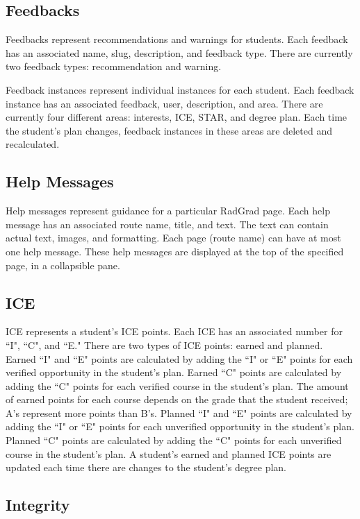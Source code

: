 \subsection{Feedbacks}
Feedbacks represent recommendations and warnings for students. Each feedback has an associated name, slug, description, and feedback type. There are currently two feedback types: recommendation and warning. 

Feedback instances represent individual instances for each student. Each feedback instance has an associated feedback, user, description, and area. There are currently four different areas: interests, ICE, STAR, and degree plan. Each time the student's plan changes, feedback instances in these areas are deleted and recalculated.

\subsection{Help Messages}
Help messages represent guidance for a particular RadGrad page. Each help message has an associated route name, title, and text. The text can contain actual text, images, and formatting. Each page (route name) can have at most one help message. These help messages are displayed at the top of the specified page, in a collapsible pane.  


\subsection{ICE}
ICE represents a student's ICE points. Each ICE has an associated number for ``I", ``C", and ``E." There are two types of ICE points: earned and planned. Earned ``I" and ``E" points are calculated by adding the ``I" or ``E" points for each verified opportunity in the student's plan. Earned ``C" points are calculated by adding the ``C" points for each verified course in the student's plan. The amount of earned points for each course depends on the grade that the student received; A's represent more points than B's. Planned ``I" and ``E" points are calculated by adding the ``I" or ``E" points for each unverified opportunity in the student's plan. Planned ``C" points are calculated by adding the ``C" points for each unverified course in the student's plan. A student's earned and planned ICE points are updated each time there are changes to the student's degree plan. 

\subsection{Integrity}
